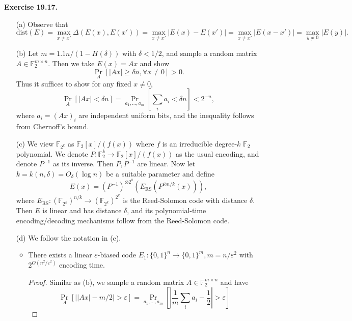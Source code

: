 \documentclass[a4paper]{article}
\newenvironment{exercise}[1]{
	\par
	\noindent\textbf{Exercise #1.}\quad
}{
	\par
	\bigskip
}
\newcommand{\abs}[1]{\left| #1 \right|}
\newcommand{\pbra}[1]{\left( #1 \right)}
\newcommand{\sbra}[1]{\left[ #1 \right]}
\newcommand{\bin}{\{0,1\}}
\newcommand{\Fbb}{\mathbb{F}}
\newcommand{\eps}{\varepsilon}
\begin{document}
    \begin{exercise}{19.17}
        \begin{itemize}
            \item[(a)] Observe that
                $$
                    \text{dist}(E)=\max_{x\neq x'}\Delta(E(x),E(x'))=\max_{x\neq x'}\abs{E(x)-E(x')}=\max_{x\neq x'}\abs{E(x-x')}
                    =\max_{y\neq0}\abs{E(y)}.
                $$
            \item[(b)] Let $m=1.1n/(1-H(\delta))$ with $\delta<1/2$, and sample a random matrix $A\in\Fbb_2^{m\times n}$.
                Then we take $E(x)=Ax$ and show 
                $$
                \Pr_A\sbra{\abs{Ax}\geq\delta n,\forall x\neq0}>0.
                $$
                Thus it suffices to show for any fixed $x\neq0$, 
                $$
                \Pr_A\sbra{\abs{Ax}<\delta n}=\Pr_{a_1,\ldots,a_m}\sbra{\sum_ia_i<\delta n}<2^{-n},
                $$
                where $a_i=(Ax)_i$ are independent uniform bits, and the inequality follows from Chernoff's bound.
            \item[(c)] We view $\Fbb_{2^k}$ as $\Fbb_2[x]/(f(x))$ where $f$ is an irreducible degree-$k$ $\Fbb_2$ polynomial.
                We denote $P:\Fbb_2^k\to\Fbb_2[x]/(f(x))$ as the usual encoding, and denote $P^{-1}$ as its inverse.
                Then $P,P^{-1}$ are linear. Now let $k=k(n,\delta)=O_\delta(\log n)$ be a suitable parameter and define 
                $$
                E(x)=(P^{-1})^{\otimes 2^k}(E_\text{RS}(P^{\otimes n/k}(x))),
                $$
                where $E_\text{RS}:(\Fbb_{2^k})^{n/k}\to(\Fbb_{2^k})^{2^k}$ is the Reed-Solomon code with distance $\delta$. 
                Then $E$ is linear and has distance $\delta$, and its polynomial-time
                encoding/decoding mechanisms follow from the Reed-Solomon code.
            \item[(d)]
                We follow the notation in (c). 
                \begin{itemize}
                    \item There exists a linear $\eps$-biased code $E_1:\bin^n\to\bin^m,m=n/\eps^2$ with 
                        $2^{O\pbra{n^2/\eps^2}}$ encoding time.
                        \begin{proof}
                        Similar as (b), we sample a random matrix $A\in\Fbb_2^{m\times n}$ and have 
                        $$
                        \Pr_A\sbra{\abs{\abs{Ax}-m/2}>\eps}
                        =\Pr_{a_1,\ldots,a_m}\sbra{\abs{\frac1m\sum_ia_i-\frac12}>\eps}
$$
\end{proof}
\end{itemize}
\end{itemize}
\end{exercise}
\end{document}
